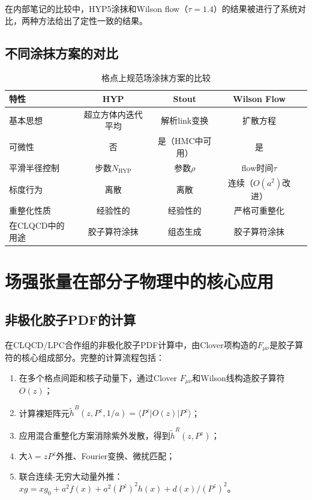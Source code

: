 \documentclass[12pt,a4paper]{ctexart}
\theoremstyle{definition}
\begin{document}
在内部笔记的比较中\cite{NoteGluonPDFs}，HYP5涂抹和Wilson flow（$\tau = 1.4$）的结果被进行了系统对比，两种方法给出了定性一致的结果。

\subsection{不同涂抹方案的对比}

\begin{table}[H]
\centering
\caption{格点上规范场涂抹方案的比较}
\label{tab:smearing_comparison}
\begin{tabular}{lcccc}
\toprule
特性 & HYP & Stout & Wilson Flow \\
\midrule
基本思想 & 超立方体内迭代平均 & 解析link变换 & 扩散方程 \\
可微性 & 否 & 是（HMC中可用） & 是 \\
平滑半径控制 & 步数$N_{\text{HYP}}$ & 参数$\rho$ & flow时间$\tau$ \\
标度行为 & 离散 & 离散 & 连续（$O(a^2)$改进） \\
重整化性质 & 经验性的 & 经验性的 & 严格可重整化 \\
在CLQCD中的用途 & 胶子算符涂抹 & 组态生成 & 胶子算符涂抹 \\
\bottomrule
\end{tabular}
\end{table}

\section{场强张量在部分子物理中的核心应用}

\subsection{非极化胶子PDF的计算}

在CLQCD/LPC合作组的非极化胶子PDF计算中\cite{Chen2025gluon}，由Clover项构造的$F_{\mu\nu}$是胶子算符的核心组成部分。完整的计算流程包括：

\begin{enumerate}
    \item 在多个格点间距和核子动量下，通过Clover $F_{\mu\nu}$和Wilson线构造胶子算符$O(z)$；
    \item 计算裸矩阵元$\tilde{h}^B(z, P^z, 1/a) = \langle P^z|O(z)|P^z\rangle$；
    \item 应用混合重整化方案消除紫外发散，得到$\tilde{h}^R(z, P^z)$；
    \item 大$\lambda = zP^z$外推、Fourier变换、微扰匹配；
    \item 联合连续-无穷大动量外推：$xg = xg_0 + a^2 f(x) + a^2 (P^z)^2 h(x) + d(x)/(P^z)^2$。
\end{enumerate}
\end{document}
